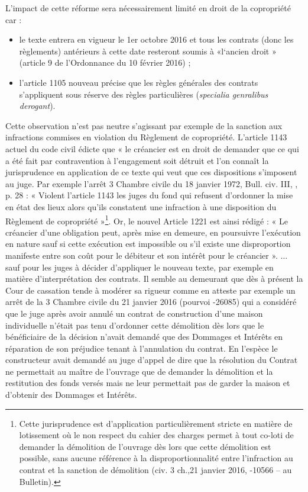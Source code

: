 			L’impact de cette réforme sera nécessairement limité en droit de la copropriété car :
			\begin{itemize}
				\item le texte entrera en vigueur le 1er octobre 2016 et tous les contrats (donc les règlements) antérieurs à cette date resteront soumis à «l‘ancien droit » (article 9 de l’Ordonnance du 10 février 2016) ;
				\item l’article 1105 nouveau précise que les règles générales des contrats s’appliquent sous réserve des règles particulières (\emph{specialia genralibus derogant}).
			\end{itemize}
			
			Cette observation n’est pas neutre s’agissant par exemple de la sanction aux infractions commises en violation du Règlement de copropriété.
			L’article 1143 actuel du code civil édicte que « le créancier est en droit de demander que ce qui a été fait par contravention à l’engagement soit détruit et l’on connaît la jurisprudence en application de ce texte qui veut que ces dispositions s’imposent au juge.
			Par exemple l’arrêt 3\ieme{} Chambre civile du 18 janvier 1972, Bull. civ. III, , p. 28 : « Violent l’article 1143 les juges du fond qui refusent d’ordonner la mise en état des lieux alors qu’ils constatent une infraction à une disposition du Règlement de copropriété »\footnote{
			Cette jurisprudence est d’application particulièrement stricte en matière de lotissement où le non respect du cahier des charges permet à tout co-loti de demander la démolition de l’ouvrage dès lors que cette démolition est possible, sans aucune référence à la disproportionnalité entre l’infraction au contrat et la sanction de démolition (civ. 3\ieme{} ch.,21 janvier 2016, -10566 – au Bulletin).
			}.
			Or, le nouvel Article 1221 est ainsi rédigé : « Le créancier d'une obligation peut, après mise en demeure, en poursuivre l'exécution en nature sauf si cette exécution est impossible ou s'il existe une disproportion manifeste entre son coût pour le débiteur et son intérêt pour le créancier ».
			$\dots$ sauf pour les juges à décider d’appliquer le nouveau texte, par exemple en matière d’interprétation des contrats. Il semble au demeurant que dès à présent la Cour de cassation tende à modérer sa rigueur comme en atteste par exemple un arrêt de la 3\ieme{} Chambre civile du 21 janvier 2016 (pourvoi -26085) qui a considéré que le juge après avoir annulé un contrat de construction d’une maison individuelle n’était pas tenu d’ordonner cette démolition dès lors que le bénéficiaire de la décision n’avait demandé que des Dommages et Intérêts en réparation de son préjudice tenant à l’annulation du contrat. En l’espèce le constructeur avait demandé au juge d’appel de dire que la résolution du Contrat ne permettait au maître de l’ouvrage que de demander la démolition et la restitution des fonds versés mais ne leur permettait pas de garder la maison et d’obtenir des Dommages et Intérêts.
